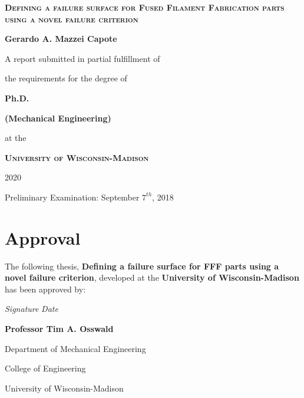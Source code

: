 \documentclass[main.tex]{subfiles}
\begin{document}
\begin{titlepage}
	\begin{center}
		\vspace{1cm}
		{\scshape\Huge\textbf{Defining a failure surface for Fused Filament Fabrication parts using a novel failure criterion} \par}
		\vspace{1cm}
		{\LARGE\textbf{Gerardo A. Mazzei Capote} \par}
		\vspace{1cm}
		{\Large A report submitted in partial fulfillment of \par 
				the requirements for the degree of \par}
		\vspace{1cm}
		{\LARGE\textbf{Ph.D.} \par}
		{\LARGE\textbf{(Mechanical Engineering)} \par}
		\vspace{1cm}
		{\Large at the \par}
		\vspace{0.5cm}
		{\scshape\LARGE\textbf{ University of Wisconsin-Madison} \par}
		\vspace{0.5cm}
		{\Large 2020 \par}
		\vfill
		{\large Preliminary Examination: September $7^{th}$, 2018}		%
	\end{center}
\end{titlepage}

\pagestyle{empty}
\cleardoublepage
\setcounter{page}{1}

\chapter*{Approval}
The following thesis, \textbf{Defining a failure surface for FFF parts using a novel failure criterion}, developed at the \textbf{University of Wisconsin-Madison}
has been approved by:
\vspace{2cm}

\noindent
\makebox[7cm]{\hrulefill} \hfill\makebox[4cm]{\hrulefill}
\par\noindent
\textit{Signature} \hfill\textit{Date}\hspace{3cm}
\vspace{5 mm}
\par\noindent
\textbf{Professor Tim A. Osswald}
\par\noindent Department of Mechanical Engineering
\par\noindent College of Engineering
\par\noindent University of Wisconsin-Madison

\cleardoublepage
\end{document}

